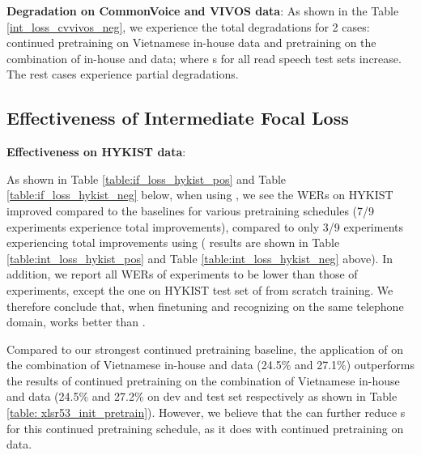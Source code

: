 

\textbf{Degradation on CommonVoice and VIVOS data}: As shown in the Table \ref{int_loss_cvvivos_neg}, we experience the total degradations for 2 cases: continued pretraining on Vietnamese in-house data and pretraining on the combination of in-house and  data; where s for all read speech test sets increase.
The rest cases experience partial degradations.



\bigskip

\subsection{Effectiveness of Intermediate Focal Loss}

\textbf{Effectiveness on HYKIST data}: 

As shown in Table \ref{table:if_loss_hykist_pos} and Table \ref{table:if_loss_hykist_neg} below, when using , we see the \Glspl{WER} on HYKIST improved compared to the baselines for various pretraining schedules (7/9 experiments experience total improvements), compared to only 3/9 experiments experiencing total improvements using  ( results are shown in Table \ref{table:int_loss_hykist_pos} and Table \ref{table:int_loss_hykist_neg} above).
In addition, we report all \Glspl{WER} of  experiments to be lower than those of  experiments, except the one on HYKIST test set of from scratch training. 
We therefore conclude that, when finetuning and recognizing on the same telephone domain,  works better than . 

Compared to our strongest continued pretraining baseline, the application of  on the combination of Vietnamese in-house and  data (24.5\% and 27.1\%) outperforms the results of continued pretraining on the combination of Vietnamese in-house and  data (24.5\% and 27.2\% on dev and test set respectively as shown in Table \ref{table: xlsr53_init_pretrain}).
However, we believe that the  can further reduce s for this continued pretraining schedule, as it does with continued pretraining on  data. 

